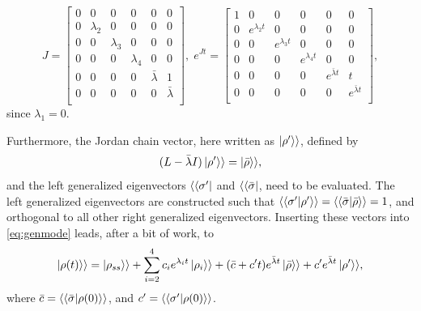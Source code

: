 \documentclass[../main.tex]{subfiles}
\begin{document}
\begin{equation}
    J = \begin{bmatrix} 0 & 0 & 0 & 0 & 0 & 0 \\
                        0 & \lambda_2 & 0 & 0 & 0 & 0 \\
                        0 & 0 & \lambda_3 & 0 & 0 & 0 \\
                        0 & 0 & 0 & \lambda_4 & 0 & 0 \\
                        0 & 0 & 0 & 0 & \bar \lambda & 1 \\
                        0 & 0 & 0 & 0 & 0 & \bar \lambda \\ \end{bmatrix}, \; 
        e^{Jt} = \begin{bmatrix} 1 & 0 & 0 & 0 & 0 & 0 \\
            0 & e^{\lambda_2t} & 0 & 0 & 0 & 0 \\
            0 & 0 & e^{\lambda_3t} & 0 & 0 & 0 \\
            0 & 0 & 0 & e^{\lambda_4t} & 0 & 0 \\
            0 & 0 & 0 & 0 & e^{\bar \lambda t} & t \\
        0 & 0 & 0 & 0 & 0 & e^{\bar \lambda t} \\ \end{bmatrix},
\end{equation}
since $\lambda_1 = 0$.

Furthermore, the Jordan chain vector, here written as $\ket{\rho'}\rangle$, defined by
\begin{equation}
    (L - \bar\lambda I)\ket{\rho'}\rangle = \ket{\bar\rho}\rangle,
\end{equation}
and the left generalized eigenvectors $\langle\bra{\sigma'}$ and $\langle\bra{\bar\sigma}$, need to be evaluated. The left generalized eigenvectors are constructed such that $\langle\braket{\sigma'|\rho'}\rangle = \langle\braket{\bar\sigma|\bar\rho}\rangle = 1$, and orthogonal to all other right generalized eigenvectors. Inserting these vectors into \cref{eq:genmode} leads, after a bit of work, to
\begin{equation}\label{eq:dynep}
    \begin{aligned}
        \ket{\rho(t)}\rangle = \ket{\rho_{ss}}\rangle + \sum_{i=2}^4 c_i e^{\lambda_i t} \ket{\rho_i}\rangle  
                                + (\bar c + c't)e^{\bar \lambda t}\ket{\bar \rho}\rangle + c'e^{\bar\lambda t}\ket{\rho'}\rangle,
    \end{aligned}
\end{equation}
where $\bar c = \langle\braket{\bar\sigma|\rho(0)}\rangle$, and $c' = \langle\braket{\sigma'|\rho(0)}\rangle$.
\end{document}
